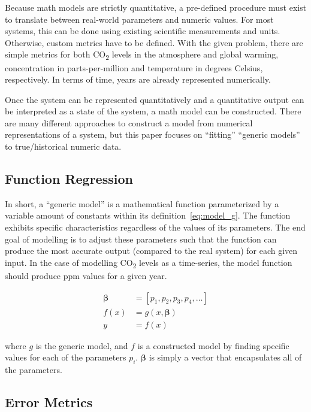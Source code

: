 \documentclass{mcmthesis}
\begin{document}
    Because math models are strictly quantitative, a pre-defined procedure must exist to translate between real-world parameters and numeric values. For most systems, this can be done using existing scientific measurements and units. Otherwise, custom metrics have to be defined. With the given problem, there are simple metrics for both CO\textsubscript{2} levels in the atmosphere and global warming, concentration in parts-per-million and temperature in degrees Celsius, respectively. In terms of time, years are already represented numerically.

    Once the system can be represented quantitatively and a quantitative output can be interpreted as a state of the system, a math model can be constructed. There are many different approaches to construct a model from numerical representations of a system, but this paper focuses on ``fitting'' ``generic models'' to true/historical numeric data.


    \subsection{Function Regression}

    In short, a ``generic model'' is a mathematical function parameterized by a variable amount of constants within its definition~\eqref{eq:model_g}. The function exhibits specific characteristics regardless of the values of its parameters. The end goal of modelling is to adjust these parameters such that the function can produce the most accurate output (compared to the real system) for each given input. In the case of modelling CO\textsubscript{2} levels as a time-series, the model function should produce ppm values for a given year.

    \begin{equation}
        \begin{aligned}
            \bm{\beta} &= [p_1, p_2, p_3, p_4, \dots] \\
            f(x) &= g(x, \bm{\beta}) \\
            y &= f(x)
        \end{aligned}
        \label{eq:model_g}
    \end{equation}

    \noindent where $g$ is the generic model, and $f$ is a constructed model by finding specific values for each of the parameters $p_i$. $\bm{\beta}$ is simply a vector that encapsulates all of the parameters.


    \subsection{Error Metrics}
\end{document}
